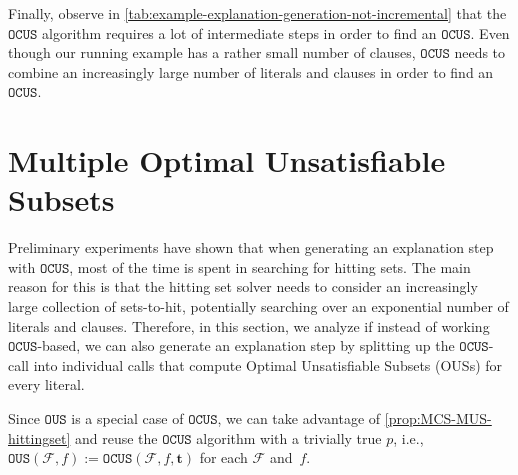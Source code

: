 \documentclass[twoside,11pt]{article}
\newcommand\m[1]{\mathcal{#1}}
\newcommand\comment[1]{\marginpar{\tiny #1}}
\renewcommand\comment[1]{#1}
\newcommand{\emilio}[1]{{\comment{\color{red}Emilio: #1}}}
\newcommand{\bart}[1]{{\comment{\color{OliveGreen}Bart: #1}}}
\newcommand\formula{\ensuremath{\m{F} }\xspace}
\newcommand\mm[1]{\ensuremath{#1}\xspace}
\newcommand\ltrue{\mm{\textbf{t}}}
\newcommand\call[1]{\mm{\texttt{#1}}}
\newcommand\omus{\mm{\call{OUS}}}
\newcommand\comus{\mm{\call{OCUS}}}
\newcommand\corrsubsets{\mm{\call{CorrSubsets}}}
\begin{document}
Finally, observe in \cref{tab:example-explanation-generation-not-incremental} that the \comus algorithm requires a lot of intermediate steps in order to find an \comus. Even though our running example has a rather small number of clauses, \comus needs to combine an increasingly large number of literals and clauses in order to find an \comus. 


\section{Multiple Optimal Unsatisfiable Subsets}\label{sec:OUS} %

Preliminary experiments have shown that when generating an explanation step with \comus, most of the time is spent in searching for hitting sets. 
The main reason for this is that the hitting set solver needs to consider an increasingly large collection of sets-to-hit, potentially searching over an exponential number of literals and clauses.
Therefore, in this section, we analyze if instead of working \comus-based, we can also generate an explanation step by splitting up the \comus-call into individual calls that compute Optimal Unsatisfiable Subsets (OUSs) for every literal.

Since \omus{} is a special case of \comus{}, we can take advantage of \cref{prop:MCS-MUS-hittingset} and reuse the \comus algorithm with a trivially true $p$, i.e., 
$\omus{}(\formula,f):=\comus{}(\formula,f,\ltrue) $ for each $\formula$ and~$f$. 
\end{document}
